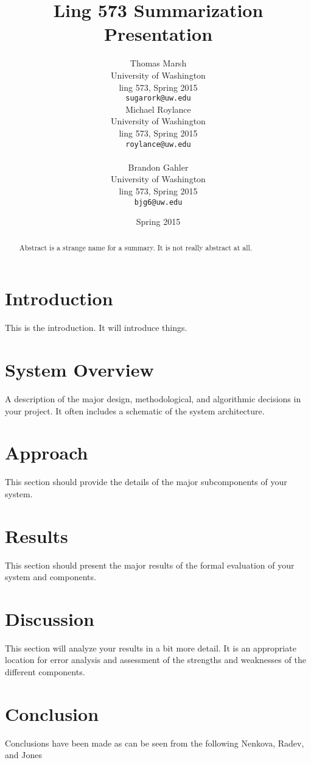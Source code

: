 \documentclass[11pt]{article}
\title{Ling 573 Summarization Presentation}
\author{Thomas Marsh \\
  University of Washington \\
  ling 573, Spring 2015 \\
  {\tt sugarork@uw.edu\hspace{5mm}} \\\And
  Michael Roylance \\
  University of Washington \\
  ling 573, Spring 2015 \\
  {\tt roylance@uw.edu} \\
\\\And
  Brandon Gahler  \\
  University of Washington \\
  ling 573, Spring 2015 \\
  {\tt bjg6@uw.edu} \\}
\date{Spring 2015}
\begin{document}
\maketitle
\begin{abstract}
  Abstract is a strange name for a summary.  It is not really abstract at all.
\end{abstract}


\section{Introduction}

This is the introduction.  It will introduce things. 

\section{System Overview}

A description of the major design, methodological, and algorithmic decisions in your project. It often includes a schematic of the system architecture.

\section{Approach}

This section should provide the details of the major subcomponents of your system.

\section{Results}

This section should present the major results of the formal evaluation of your system and components.

\section{Discussion}

This section will analyze your results in a bit more detail. It is an appropriate location for error analysis and assessment of the strengths and weaknesses of the different components.

\section{Conclusion}
Conclusions have been made as can be seen from the following Nenkova, Radev, and Jones \cite{nenkova2007pyramid} \cite{SpärckJones20071449} \cite{radev2001experiments}



\end{document}
